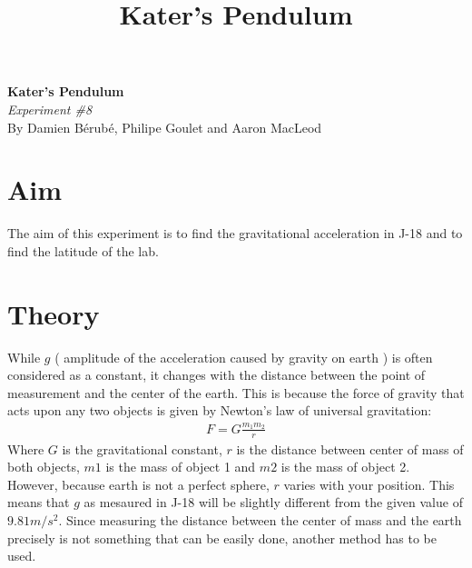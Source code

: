 \documentclass[12pt]{article}
\begin{document}
\title{Kater's Pendulum}
\begin{center}
    \large\textbf{Kater's Pendulum}\\
    \normalsize \textit{Experiment \#8}\\
    By Damien Bérubé, Philipe Goulet and Aaron MacLeod
\end{center}

\section*{Aim}

The aim of this experiment is to find the gravitational acceleration in J-18 and to find the latitude of the lab.

\section*{Theory}

While $g$ ( amplitude of the acceleration caused by gravity on earth ) is often considered as a constant, it changes with the distance between the point of measurement and the center of the earth. This is because the force of gravity that acts upon any two objects is given by Newton’s law of universal gravitation:
\begin{gather}
    F=G\frac{m_1m_2}{r}
\end{gather}
Where $G$ is the gravitational constant, $r$ is the distance between center of mass of both objects, $m1$ is the mass of object 1 and $m2$ is the mass of object 2.\\

However, because earth is not a perfect sphere, $r$ varies with your position. This means that $g$ as mesaured in J-18 will be slightly different from the given value of $9.81 \si{m/s^2}$. Since measuring the distance between the center of mass and the earth precisely is not something that can be easily done, another method has to be used.\\ 
\end{document}

